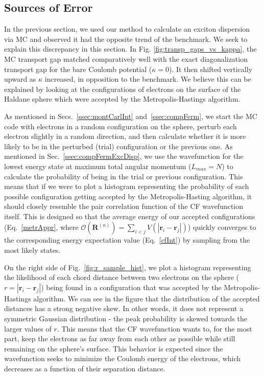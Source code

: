     \subsection{Sources of Error} \label{ssec:sourcErr}
    
    In the previous section, we used our method to calculate an exciton dispersion via MC and observed it had the opposite trend of the benchmark. We seek to explain this discrepancy in this section. In Fig. \ref{fig:transp_gaps_vs_kappa}, the MC transport gap matched comparatively well with the exact diagonalization transport gap for the bare Coulomb potential ($\kappa=0$). It then shifted vertically upward as $\kappa$ increased, in opposition to the benchmark. We believe this can be explained by looking at the configurations of electrons on the surface of the Haldane sphere which were accepted by the Metropolis-Hastings algorithm. 
    
    As mentioned in Secs.~\ref{ssec:montCarlInt} and~\ref{ssec:compFerm}, we start the MC code with electrons in a random configuration on the sphere, perturb each electron slightly in a random direction, and then calculate whether it is more likely to be in the perturbed (trial) configuration or the previous one. As mentioned in Sec.~\ref{ssec:compFermExcDisp}, we use the wavefunction for the lowest energy state at maximum total angular momentum ($L_{max}=N$) to calculate the probability of being in the trial or previous configuration. This means that if we were to plot a histogram representing the probability of each possible configuration getting accepted by the Metropolis-Hasting algorithm, it should closely resemble the pair correlation function of the CF wavefunction itself. This is designed so that the average energy of our accepted configurations (Eq.~\ref{metrAppr}, where $\mathcal{O}(\mathbf{R}^{(n)})=\sum_{i<j}V(|\mathbf{r}_i-\mathbf{r}_j|)$) quickly converges to the corresponding energy expectation value (Eq.~\ref{cfInt}) by sampling from the most likely states. 
    
    On the right side of Fig.~\ref{fig:r_sample_hist}, we plot a histogram representing the likelihood of each chord distance between two electrons on the sphere ($r=|\mathbf{r}_i-\mathbf{r}_j|$) being found in a configuration that was accepted by the Metropolis-Hastings algorithm. We can see in the figure that the distribution of the accepted distances has a strong negative skew. In other words, it does not represent a symmetric Gaussian distribution - the peak probability is skewed towards the larger values of $r$. This means that the CF wavefunction wants to, for the most part, keep the electrons as far away from each other as possible while still remaining on the sphere's surface. This behavior is expected since the wavefunction seeks to minimize the Coulomb energy of the electrons, which decreases as a function of their separation distance.
    
